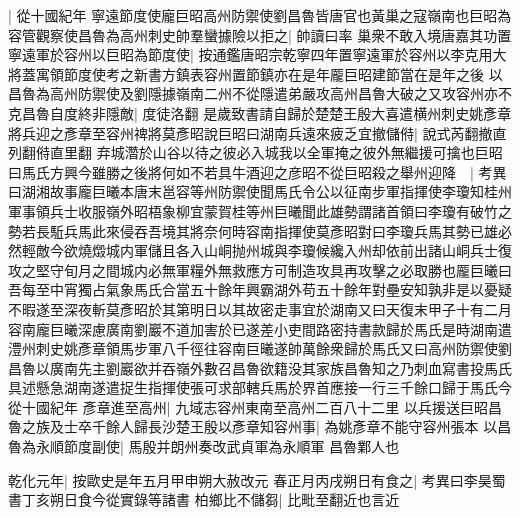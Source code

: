|{
	從十國紀年}
寧遠節度使龐巨昭高州防禦使劉昌魯皆唐官也黃巢之寇嶺南也巨昭為容管觀察使昌魯為高州刺史帥羣蠻據險以拒之|{
	帥讀曰率}
巢衆不敢入境唐嘉其功置寧遠軍於容州以巨昭為節度使|{
	按通鑑唐昭宗乾寧四年置寧遠軍於容州以李克用大將蓋寓領節度使考之新書方鎮表容州置節鎮亦在是年龎巨昭建節當在是年之後}
以昌魯為高州防禦使及劉隱據嶺南二州不從隱遣弟嚴攻高州昌魯大破之又攻容州亦不克昌魯自度終非隱敵|{
	度徒洛翻}
是歲致書請自歸於楚楚王殷大喜遣横州刺史姚彥章將兵迎之彥章至容州禆將莫彥昭說巨昭曰湖南兵遠來疲乏宜撤儲偫|{
	說式芮翻撤直列翻偫直里翻}
弃城濳於山谷以待之彼必入城我以全軍掩之彼外無繼援可擒也巨昭曰馬氏方興今雖勝之後將何如不若具牛酒迎之彦昭不從巨昭殺之舉州迎降　|{
	考異曰湖湘故事龐巨曦本唐末邕容等州防禦使聞馬氏令公以征南步軍指揮使李瓊知桂州軍事領兵士收服嶺外昭梧象柳宜蒙賀桂等州巨曦聞此雄勢謂諸首領曰李瓊有破竹之勢若長駈兵馬此來侵吞吾境其將奈何時容南指揮使莫彥昭對曰李瓊兵馬其勢已雄必然輕敵今欲燒燬城内軍儲且各入山峒抛州城與李瓊候纔入州却依前出諸山峒兵士復攻之堅守旬月之間城内必無軍糧外無救應方可制造攻具再攻擊之必取勝也龎巨曦曰吾每至中宵獨占氣象馬氏合當五十餘年興霸湖外苟五十餘年對壘安知孰非是以憂疑不暇遂至深夜斬莫彥昭於其第明日以其故密走事宜於湖南又曰天復末甲子十有二月容南龐巨曦深慮廣南劉巖不道加害於已遂差小吏間路密持書款歸於馬氏是時湖南遣澧州刺史姚彥章領馬步軍八千徑往容南巨曦遂帥萬餘衆歸於馬氏又曰高州防禦使劉昌魯以廣南先主劉巖欲并吞嶺外數召昌魯欲籍没其家族昌魯知之乃刺血寫書投馬氏具述懸急湖南遂遣捉生指揮使張可求部轄兵馬於界首應接一行三千餘口歸于馬氏今從十國紀年}
彥章進至高州|{
	九域志容州東南至高州二百八十二里}
以兵援送巨昭昌魯之族及士卒千餘人歸長沙楚王殷以彥章知容州事|{
	為姚彥章不能守容州張本}
以昌魯為永順節度副使|{
	馬殷并朗州奏改武貞軍為永順軍}
昌魯鄴人也

乾化元年|{
	按歐史是年五月甲申朔大赦改元}
春正月丙戌朔日有食之|{
	考異曰李昊蜀書丁亥朔日食今從實錄等諸書}
柏鄉比不儲芻|{
	比毗至翻近也言近}


